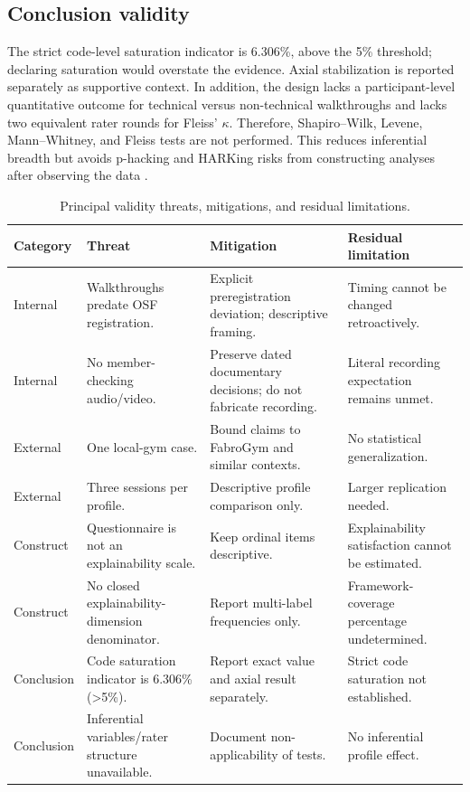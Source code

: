 \documentclass[pdflatex,sn-basic]{sn-jnl}
\begin{document}
\subsection{Conclusion validity}
The strict code-level saturation indicator is 6.306\%, above the 5\% threshold; declaring saturation would overstate the evidence. Axial stabilization is reported separately as supportive context. In addition, the design lacks a participant-level quantitative outcome for technical versus non-technical walkthroughs and lacks two equivalent rater rounds for Fleiss' $\kappa$. Therefore, Shapiro--Wilk, Levene, Mann--Whitney, and Fleiss tests are not performed. This reduces inferential breadth but avoids p-hacking and HARKing risks from constructing analyses after observing the data \cite{simmons2011,kerr1998}.

\begin{table}[H]
\caption{Principal validity threats, mitigations, and residual limitations.}\label{tab:validity}
\centering\small
\begin{tabularx}{\textwidth}{@{}p{2.0cm}X X X@{}}
\toprule
Category & Threat & Mitigation & Residual limitation \\
\midrule
Internal & Walkthroughs predate OSF registration. & Explicit preregistration deviation; descriptive framing. & Timing cannot be changed retroactively.\\
Internal & No member-checking audio/video. & Preserve dated documentary decisions; do not fabricate recording. & Literal recording expectation remains unmet.\\
External & One local-gym case. & Bound claims to FabroGym and similar contexts. & No statistical generalization.\\
External & Three sessions per profile. & Descriptive profile comparison only. & Larger replication needed.\\
Construct & Questionnaire is not an explainability scale. & Keep ordinal items descriptive. & Explainability satisfaction cannot be estimated.\\
Construct & No closed explainability-dimension denominator. & Report multi-label frequencies only. & Framework-coverage percentage undetermined.\\
Conclusion & Code saturation indicator is 6.306\% (>5\%). & Report exact value and axial result separately. & Strict code saturation not established.\\
Conclusion & Inferential variables/rater structure unavailable. & Document non-applicability of tests. & No inferential profile effect.\\
\bottomrule
\end{tabularx}
\end{table}
\end{document}
